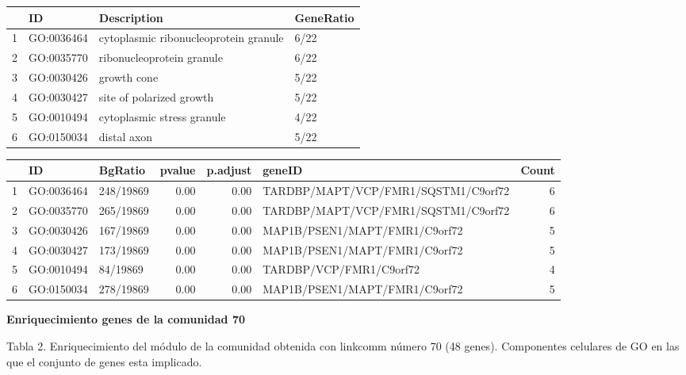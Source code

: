 \hfill


\begin{table}[ht]
\centering
\begin{tabular}{rlll}
  \hline
 & ID & Description & GeneRatio \\ 
  \hline
1 & GO:0036464 & cytoplasmic ribonucleoprotein granule & 6/22 \\ 
  2 & GO:0035770 & ribonucleoprotein granule & 6/22 \\ 
  3 & GO:0030426 & growth cone & 5/22 \\ 
  4 & GO:0030427 & site of polarized growth & 5/22 \\ 
  5 & GO:0010494 & cytoplasmic stress granule & 4/22 \\ 
  6 & GO:0150034 & distal axon & 5/22 \\ 
   \hline
\end{tabular}
\end{table}

\begin{table}[ht]
\centering
\begin{tabular}{rllrrlr}
  \hline
 & ID & BgRatio & pvalue & p.adjust & geneID & Count \\ 
  \hline
1 & GO:0036464 & 248/19869 & 0.00 & 0.00 & TARDBP/MAPT/VCP/FMR1/SQSTM1/C9orf72 &   6 \\ 
  2 & GO:0035770 & 265/19869 & 0.00 & 0.00 & TARDBP/MAPT/VCP/FMR1/SQSTM1/C9orf72 &   6 \\ 
  3 & GO:0030426 & 167/19869 & 0.00 & 0.00 & MAP1B/PSEN1/MAPT/FMR1/C9orf72 &   5 \\ 
  4 & GO:0030427 & 173/19869 & 0.00 & 0.00 & MAP1B/PSEN1/MAPT/FMR1/C9orf72 &   5 \\ 
  5 & GO:0010494 & 84/19869 & 0.00 & 0.00 & TARDBP/VCP/FMR1/C9orf72 &   4 \\ 
  6 & GO:0150034 & 278/19869 & 0.00 & 0.00 & MAP1B/PSEN1/MAPT/FMR1/C9orf72 &   5 \\ 
   \hline
\end{tabular}
\end{table}

\newpage

\textbf{Enriquecimiento genes de la comunidad 70}

 Tabla 2. Enriquecimiento del módulo de la comunidad obtenida con linkcomm número 70 (48 genes). Componentes celulares de GO en las que el conjunto de genes esta implicado.

\hfill


